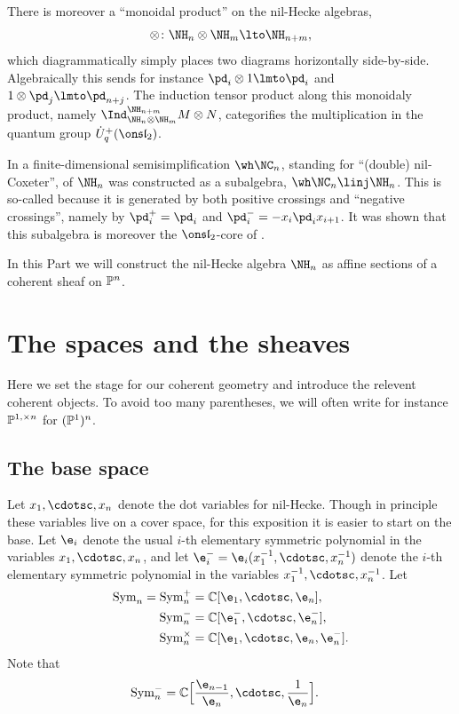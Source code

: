 \documentclass[11pt,reqno]{amsart}
\begin{document}
There is moreover a ``monoidal product'' on the nil-Hecke algebras,
\[\otimes\colon \NH_n\otimes\NH_m\lto\NH_{n+m},\]
which diagrammatically simply places two diagrams horizontally side-by-side. Algebraically this sends for instance $\pd_i\otimes 1\lmto \pd_i$ and $1\otimes \pd_j\lmto \pd_{n+j}$. The induction tensor product along this monoidaly product, namely $\Ind_{\NH_n\otimes\NH_m}^{\NH_{n+m}}M\otimes N$, categorifies the multiplication in the quantum group $\dot{{U}}_q^+(\sl_2)$. 


In \cite{KMZ} a finite-dimensional semisimplification $\wh\NC_n$, standing for ``(double) nil-Coxeter'', of $\NH_n$ was constructed as a subalgebra, $\wh\NC_n\linj \NH_n$. This is so-called because it is generated by both positive crossings and ``negative crossings'', namely by $\pd_i^+=\pd_i$ and $\pd_i^-=-x_i\pd_ix_{i+1}$. It was shown that this subalgebra is moreover the $\sl_2$-core of \cite{EQ23}. 


In this Part we will construct the nil-Hecke algebra $\NH_n$ as affine sections of a coherent sheaf on $\mathbb P^n$. 


\section{The spaces and the sheaves}
Here we set the stage for our coherent geometry and introduce the relevent coherent objects. To avoid too many parentheses, we will often write for instance $\mathbb P^{1,\times n}$ for $(\mathbb P^1)^n$. 

\subsection{The base space}
Let $x_1,\cdotsc,x_n$ denote the dot variables for nil-Hecke. Though in principle these variables live on a cover space, for this exposition it is easier to start on the base. Let $\e_i$ denote the usual $i$-th elementary symmetric polynomial in the variables $x_1,\cdotsc,x_n$, and let $\e_i^-=\e_i(x_1^{-1},\cdotsc,x_n^{-1})$ denote the $i$-th elementary symmetric polynomial in the variables $x_1^{-1},\cdotsc,x_n^{-1}$. Let
\begin{align*}
    \Sym_n=\Sym_n^+&=\BC[\e_1,\cdotsc,\e_n],\\
    \Sym_n^-&=\BC[\e_1^-,\cdotsc,\e_n^-],\\
    \Sym_n^\times&=\BC[\e_1,\cdotsc,\e_n,\e_n^-].
\end{align*}
Note that
\begin{align*}
    \Sym_n^-&=\BC\Big[\frac{\e_{n-1}}{\e_n},\cdotsc,\frac{1}{\e_n} \Big].
\end{align*}
\end{document}
